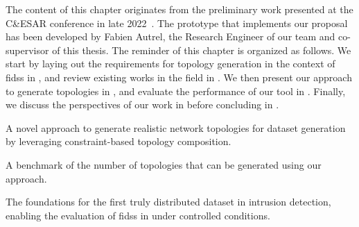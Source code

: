 The content of this chapter originates from the preliminary work presented at the C\&ESAR conference in late 2022~\cite{lavaur_cesar_2022}.
The prototype that implements our proposal has been developed by Fabien Autrel, the Research Engineer of our team and co-supervisor of this thesis.
The reminder of this chapter is organized as follows.
We start by laying out the requirements for topology generation in the context of \glspl{fids} in , and review existing works in the field in .
We then present our approach to generate topologies in , and evaluate the performance of our tool in .
Finally, we discuss the perspectives of our work in  before concluding in .

\begin{contribs}
  \item A novel approach to generate realistic network topologies for dataset generation by leveraging constraint-based topology composition.
  \item A benchmark of the number of topologies that can be generated using our approach.
  \item The foundations for the first truly distributed dataset in intrusion detection, enabling the evaluation of \glspl{fids} in under controlled conditions.
\end{contribs}